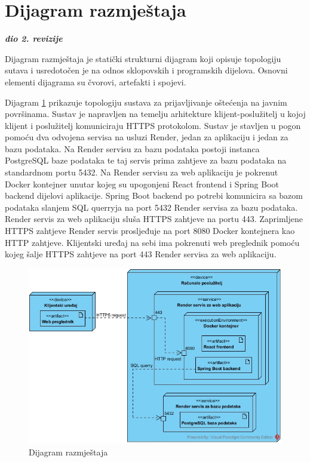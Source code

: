 			\eject 
		
		
		\section{Dijagram razmještaja}
			
			\textbf{\textit{dio 2. revizije}}
			
			Dijagram razmještaja je statički strukturni dijagram koji opisuje topologiju sutava i usredotočen je na odnos sklopovskih i programskih dijelova. Osnovni elementi dijagrama su čvorovi, artefakti i spojevi.
			
			Dijagram \ref{fig:dijagramRazmjestaja} prikazuje topologiju sustava za prijavljivanje oštećenja na javnim površinama. Sustav je napravljen na temelju arhitekture klijent-poslužitelj u kojoj klijent i poslužitelj komuniciraju HTTPS protokolom. Sustav je stavljen u pogon pomoću dva odvojena servisa na usluzi Render, jedan za aplikaciju i jedan za bazu podataka. Na Render servisu za bazu podataka postoji instanca PostgreSQL baze podataka te taj servis prima zahtjeve za bazu podataka na standardnom portu 5432. Na Render servisu za web aplikaciju je pokrenut Docker kontejner unutar kojeg su upogonjeni React frontend i Spring Boot backend dijelovi aplikacije. Spring Boot backend po potrebi komunicira sa bazom podataka slanjem SQL querryja na port 5432 Render servisa za bazu podataka. Render servis za web aplikaciju sluša HTTPS zahtjeve na portu 443. Zaprimljene HTTPS zahtjeve Render servis prosljeđuje na port 8080 Docker kontejnera kao HTTP zahtjeve. Klijentski uređaj na sebi ima pokrenuti web preglednik pomoću kojeg šalje HTTPS zahtjeve na port 443 Render servisa za web aplikaciju.
			
			\begin{figure}[H]
				\includegraphics[width=\textwidth]{slike/dijagramRazmjestaja.jpg} %
				\caption{Dijagram razmještaja}
				\label{fig:dijagramRazmjestaja} %
			\end{figure}
			

